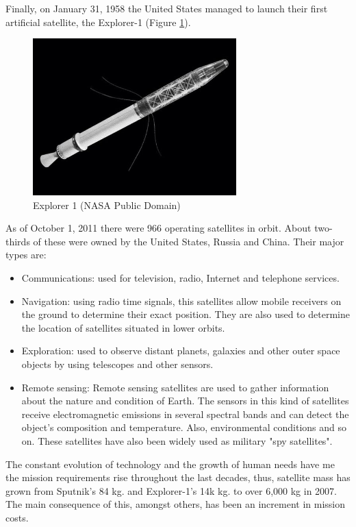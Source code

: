 Finally, on January 31, 1958 the United States managed to launch their first artificial satellite, the Explorer-1 (Figure \ref{f1.2}).\\
\begin{figure}[H]
\centerline{\includegraphics[width=0.7\textwidth]{images/explorer1.jpg}}
\caption{Explorer 1 (NASA Public Domain)}
\label{f1.2}
\end{figure}
\pagebreak

As of October 1, 2011 there were 966 operating satellites in orbit. About two-thirds of these were owned by the United States, Russia and China\cite{SBFE}. Their major types are:
\begin{itemize}
\item Communications: used for television, radio, Internet and telephone services.
\item Navigation: using radio time signals, this satellites allow mobile receivers on the ground to determine their exact position. They are also used to determine the location of satellites situated in lower orbits.
\item Exploration: used to observe distant planets, galaxies and other outer space objects by using telescopes and other sensors.
\item Remote sensing: Remote sensing satellites are used to gather information about the nature and condition of Earth. The sensors in this kind of satellites receive electromagnetic emissions in several spectral bands and can detect the object's composition and temperature. Also, environmental conditions and so on. These satellites have also been widely used as military "spy satellites".

\end{itemize}

The constant evolution of technology and the growth of human needs have me the mission requirements rise throughout the last decades, thus, satellite mass has grown from Sputnik's 84 kg. and Explorer-1's 14k kg. to over 6,000 kg in 2007\cite{BARN}. The main consequence of this, amongst others, has been an increment in mission costs.\\

